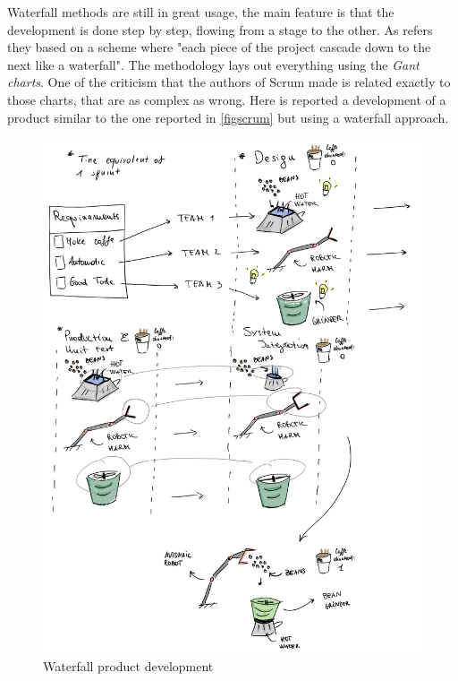 \documentclass[../main.tex]{subfiles}
\begin{document}
Waterfall methods are still in great usage, the main feature is that the development is done step by step, flowing from a stage to the other. As \cite{Scrum} refers they based on a scheme where "each piece of the project cascade down to the next like a waterfall". The methodology lays out everything using the \textit{Gant charts}. One of the criticism that the authors of Scrum made is related exactly to those charts, that are as complex as wrong. Here is reported a development of a product similar to the one reported in \ref{figscrum} but using a waterfall approach.\\
\begin{figure}[H]
    \centering
    \includegraphics[width=\linewidth]{images_folder/waterfall.png}
    \caption{Waterfall product development}
    \label{fig:swaterrddev}
\end{figure}
\end{document}
